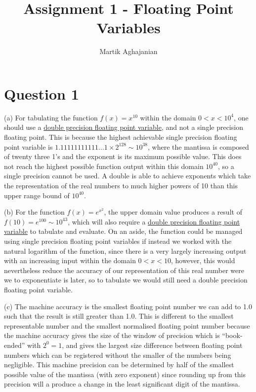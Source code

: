 \documentclass{article}
\title{Assignment 1 - Floating Point Variables}
\author{Martik Aghajanian}
\date{}
\begin{document}
\maketitle
\section{Question 1}

(a) For tabulating the function $f(x)=x^{10}$ within the domain $0<x<10^4$, one should use a \underline{double precision floating point variable}, and not a single precision floating point. This is because the highest achievable single precision floating point variable is $1.11111111111...1\times{2^{128}}\sim{10^{38}}$, where the mantissa is composed of twenty three 1's and the exponent is its maximum possible value. This does not reach the highest possible function output within this domain $10^{40}$, so a single precision cannot be used. A double is able to achieve exponents which take the representation of the real numbers to much higher powers of 10 than this upper range bound of $10^{40}$.
\newline

\noindent (b) For the function $f(x)=e^{x^2}$, the upper domain value produces a result of $f(10)=e^{100}\sim{10^{43}}$, which will also require a \underline{double precision floating point variable} to tabulate and evaluate. On an aside, the function could be managed using single precision floating point variables if instead we worked with the natural logarithm of the function, since there is a very largely increasing output with an increasing input within the domain $0<x<10$, however, this would nevertheless reduce the accuracy of our representation of this real number were we to exponentiate is later, so to tabulate we would still need a double precision floating point variable.
\newline

\noindent (c) The machine accuracy is the smallest floating point number we can add to 1.0 such that the result is still greater than 1.0. This is different to the smallest representable number and the smallest normalised floating point number because the machine accuracy gives the size of the window of precision which is “book-ended” with $2^0=1$, and gives the largest size difference between floating point numbers which can be registered without the smaller of the numbers being negligible. This machine precision can be determined by half of the smallest possible value of the mantissa (with zero exponent) since rounding up from this precision will a produce a change in the least significant digit of the mantissa.
\end{document}
